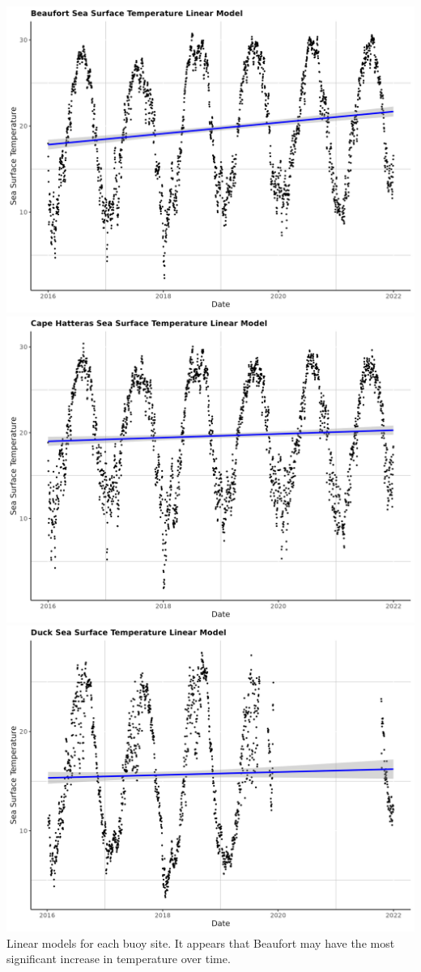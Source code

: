 \documentclass[
]{article}
\begin{document}
\includegraphics{figures/beaufsstglm.png}
\includegraphics{figures/chsstglm.png}
\includegraphics{figures/ducksstglm.png} Linear models for each buoy
site. It appears that Beaufort may have the most significant increase in
temperature over time.
\end{document}
